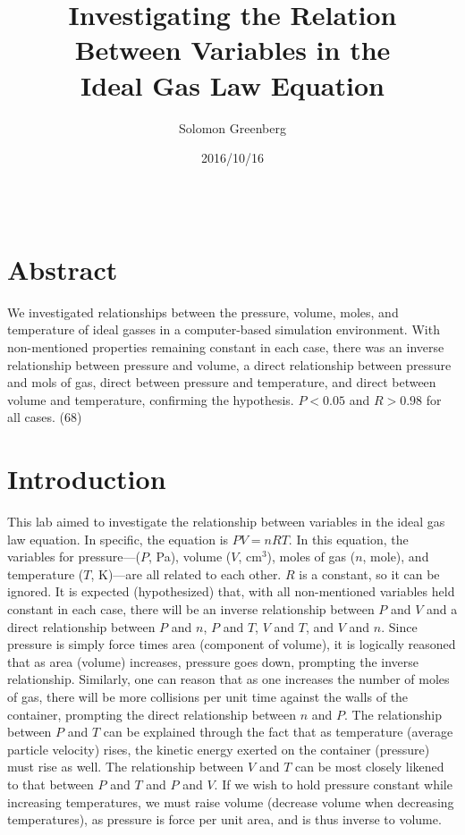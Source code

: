 \documentclass[12pt]{article}
\title{Investigating the Relation \\ Between Variables in the \\ Ideal Gas Law Equation}
\date{2016/10/16}
\author{Solomon Greenberg}
\begin{document}
\maketitle

\begin{center}
\begin{tabular}{l r}
\end{tabular}
\end{center}

\section{Abstract}
We investigated relationships between the pressure, volume, moles, and temperature of ideal gasses in a computer-based simulation environment. With non-mentioned properties remaining constant in each case, there was an inverse relationship between pressure and volume, a direct relationship between pressure and mols of gas, direct between pressure and temperature, and direct between volume and temperature, confirming the hypothesis. $P < 0.05$ and $R > 0.98$ for all cases. (68)


\section{Introduction}
This lab aimed to investigate the relationship between variables in the ideal gas law equation. In specific, the equation is $PV=nRT$. In this equation, the variables for pressure—($P$, Pa), volume ($V$, cm$^3$), moles of gas ($n$, mole), and temperature ($T$, K)—are all related to each other. $R$ is a constant, so it can be ignored. It is expected (hypothesized) that, with all non-mentioned variables held constant in each case, there will be an inverse relationship between $P$ and $V$ and a direct relationship between $P$ and $n$, $P$ and $T$, $V$ and $T$, and $V$ and $n$. Since pressure is simply force times area (component of volume), it is logically reasoned that as area (volume) increases, pressure goes down, prompting the inverse relationship. Similarly, one can reason that as one increases the number of moles of gas, there will be more collisions per unit time against the walls of the container, prompting the direct relationship between $n$ and $P$. The relationship between $P$ and $T$ can be explained through the fact that as temperature (average particle velocity) rises, the kinetic energy exerted on the container (pressure) must rise as well. The relationship between $V$ and $T$ can be most closely likened to that between $P$ and $T$ and $P$ and $V$. If we wish to hold pressure constant while increasing temperatures, we must raise volume (decrease volume when decreasing temperatures), as pressure is force per unit area, and is thus inverse to volume.
\end{document}
